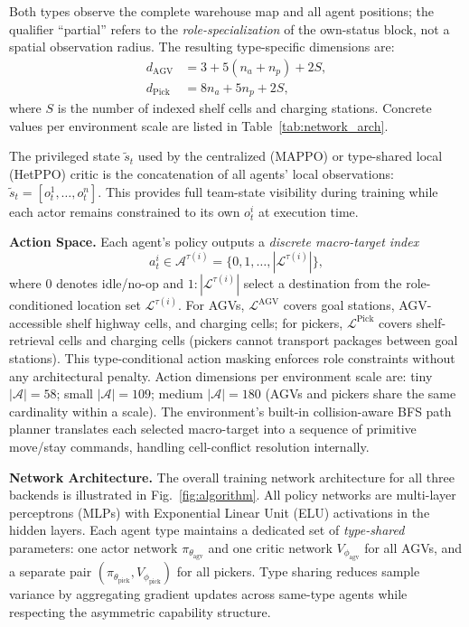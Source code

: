 \documentclass[Afour,sageh,times]{sagej}
\begin{document}
Both types observe the complete warehouse map and all agent positions; the qualifier ``partial'' refers to the \emph{role-specialization} of the own-status block, not a spatial observation radius. The resulting type-specific dimensions are:
\begin{align}
d_{\mathrm{AGV}} &= 3 + 5(n_a+n_p) + 2S, \label{eq:agv_obs}\\
d_{\mathrm{Pick}} &= 8n_a + 5n_p + 2S, \label{eq:pick_obs}
\end{align}
where $S$ is the number of indexed shelf cells and charging stations. Concrete values per environment scale are listed in Table~\ref{tab:network_arch}.

The privileged state $\tilde{s}_t$ used by the centralized (MAPPO) or type-shared local (HetPPO) critic is the concatenation of all agents' local observations: $\tilde{s}_t = [o_t^1, \ldots, o_t^n]$. This provides full team-state visibility during training while each actor remains constrained to its own $o_t^i$ at execution time.

\textbf{Action Space.} Each agent's policy outputs a \emph{discrete macro-target index}
\begin{equation}
a_t^i \in \mathcal{A}^{\tau(i)} = \{0,1,\dots,|\mathcal{L}^{\tau(i)}|\},
\end{equation}
where $0$ denotes idle/no-op and $1:|\mathcal{L}^{\tau(i)}|$ select a destination from the role-conditioned location set $\mathcal{L}^{\tau(i)}$. For AGVs, $\mathcal{L}^{\mathrm{AGV}}$ covers goal stations, AGV-accessible shelf highway cells, and charging cells; for pickers, $\mathcal{L}^{\mathrm{Pick}}$ covers shelf-retrieval cells and charging cells (pickers cannot transport packages between goal stations). This type-conditional action masking enforces role constraints without any architectural penalty. Action dimensions per environment scale are: tiny $|\mathcal{A}| = 58$; small $|\mathcal{A}| = 109$; medium $|\mathcal{A}| = 180$ (AGVs and pickers share the same cardinality within a scale). The environment's built-in collision-aware BFS path planner translates each selected macro-target into a sequence of primitive move/stay commands, handling cell-conflict resolution internally.

\textbf{Network Architecture.} The overall training network architecture for all three backends is illustrated in Fig.~\ref{fig:algorithm}. All policy networks are multi-layer perceptrons (MLPs) with Exponential Linear Unit (ELU) activations in the hidden layers. Each agent type maintains a dedicated set of \emph{type-shared} parameters: one actor network $\pi_{\theta_\mathrm{agv}}$ and one critic network $V_{\phi_\mathrm{agv}}$ for all AGVs, and a separate pair $(\pi_{\theta_\mathrm{pick}}, V_{\phi_\mathrm{pick}})$ for all pickers. Type sharing reduces sample variance by aggregating gradient updates across same-type agents while respecting the asymmetric capability structure.
\end{document}

